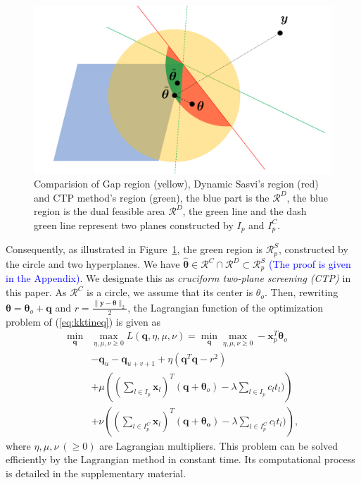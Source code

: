\documentclass[twoside]{article}
\theoremstyle{plain}
\renewcommand{\vec}[1]{\bm{#1}}
\newcommand{\changeXS}[1]{\textcolor{blue}{#1}}
\begin{document}
\begin{figure}[t]
\centering
\includegraphics[width = \linewidth]{pic/area}
\caption{Comparision of Gap region (yellow), Dynamic Sasvi's region (red) and CTP method's region (green), the blue part is the $\mathcal{R}^{D}$, the blue region is the dual feasible area $\mathcal {R}^{D}$, the green line and the dash green line represent two planes constructed by $I_p$ and $I_p^C$.}
\label{Fig:area}
\end{figure}

Consequently, as illustrated in Figure~\ref{Fig:area}, the green region is $\mathcal{R}^{S}_{p}$, constructed by the circle and two hyperplanes. We have $\hat{\vec{\theta}}  \in \mathcal{R}^{C}\cap\mathcal{R}^{D} \subset \mathcal{R}^{S}_{p}$ \changeXS{(The proof is given in the Appendix)}.
We designate this as {\it cruciform two-plane screening (CTP)} in this paper. As $\mathcal{R}^{C}$ is a circle, we assume that its center is $\theta_o$. Then, rewriting $\vec \theta = \vec \theta_o + \vec q$ and $r = \frac{\|\vec y - \vec \theta\|_2}{2}$, the Lagrangian function of the optimization problem of (\ref{eq:kktineq}) is given as 
%
\begin{equation}
\label{Eq:FinalRSCalc}
\begin{split}
\min_{\vec{q}}& \max_{\eta,\mu,\nu \geq 0} L(\vec{q},\eta,\mu,\nu) =\min_{\vec{q}}\max_{\eta,\mu,\nu\geq0} - \vec x_p^{T}\vec \theta_o \\
&- \vec{q}_{u} - \vec{q}_{u+v+1} + \eta( \vec{q}^T\vec{q} - r^2)\\
&+\mu\left( (\sum_{l\in I_p}\vec{x}_{l})^T(\vec{q}+\vec\theta_o) -  \lambda\sum_{l\in I_p}c_lt_l)\right) \\
&+ \nu\left( (\sum_{l\in I^{C}_p}\vec{x}_{l})^T(\vec{q}+\vec{\theta_o}) -\lambda\sum_{l\in I^{C}_p}c_lt_l)\right),
\end{split}
\end{equation}
where $\eta,\mu,\nu~(\geq 0)$ are Lagrangian multipliers. This problem can be solved efficiently by the Lagrangian method in constant time. Its computational process is detailed in the supplementary material.
\end{document}

